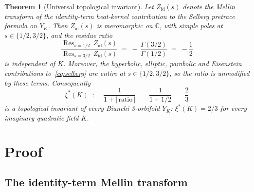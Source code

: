 \documentclass[11pt,a4paper,reqno]{amsart}
\newtheorem{theorem}{Theorem}[section]
\theoremstyle{definition}
\DeclareMathOperator{\Res}{Res}
\newcommand{\YK}{Y_K}
\newcommand{\CC}{\mathbb{C}}
\newcommand{\xis}{\xi^{*}}
\begin{document}
\begin{theorem}[Universal topological invariant]\label{thm:xistar}
Let $Z_{\mathrm{id}}(s)$ denote the Mellin transform of the identity-term heat-kernel
contribution to the Selberg pretrace formula on $\YK$. Then $Z_{\mathrm{id}}(s)$ is meromorphic on $\CC$, with simple poles at $s\in\{1/2,3/2\}$, and the residue ratio
\begin{equation}\label{eq:ratio}
  \frac{\Res_{s=1/2}\,Z_{\mathrm{id}}(s)}{\Res_{s=3/2}\,Z_{\mathrm{id}}(s)}
  \;=\; -\,\frac{\Gamma(3/2)}{\Gamma(1/2)}
  \;=\; -\frac{1}{2}
\end{equation}
is independent of $K$. Moreover, the hyperbolic, elliptic, parabolic and Eisenstein contributions to~\eqref{eq:selberg} are entire at $s\in\{1/2,3/2\}$, so the ratio is unmodified by these terms. Consequently
\begin{equation}\label{eq:xistar}
  \xis(K) \;:=\; \frac{1}{1+|\,\mathrm{ratio}\,|} \;=\; \frac{1}{1+1/2} \;=\; \frac{2}{3}
\end{equation}
is a \emph{topological invariant} of every Bianchi 3-orbifold $\YK$: $\xis(K) = 2/3$ for every imaginary quadratic field $K$.
\end{theorem}

\section{Proof}\label{sec:proof}

\subsection{The identity-term Mellin transform}\label{ss:id}
\end{document}
